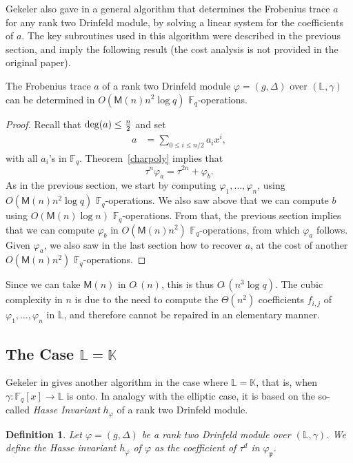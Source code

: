 \documentclass[sigconf]{acmart}
\newtheorem{definition}{Definition}
\newcommand{\M}{\mathsf{M}}
\newcommand{\K}{\mathbb{K}}
\newcommand{\F}{\mathbb{F}}
\renewcommand{\L}{\mathbb{L}}
\newcommand{\frakp}{\mathfrak{p}}
\newcommand{\softO}{O\tilde{~}}
\begin{document}
Gekeler also gave in \cite[Section~3]{frobdist} a general algorithm that
determines the Frobenius trace $a$ for any rank two Drinfeld module,
by solving a linear system for the coefficients of $a$. The key
subroutines used in this algorithm were described in the previous
section, and imply the following result (the cost analysis is not
provided in the original paper).
\begin{proposition}
  The Frobenius trace $a$ of a rank two Drinfeld module $\varphi = (g,
  \Delta)$ over $(\L,\gamma)$ can be determined in $O(\M(n)n^2 \log q)$
  $\F_q$-operations.
\end{proposition}
\begin{proof}
Recall that $\textnormal{deg}(a) \leq \frac{n}{2}$ and set
\begin{align*}
a & = \sum_{0 \le i \leq n/2} a_i x^i, 
\end{align*}
with all $a_i$'s in $\F_q$. Theorem~\ref{charpoly} implies
that 
\[ \tau^n \varphi_a = \tau^{2n} + \varphi_b.\]
As in the previous section, we start by computing
$\varphi_1,\dots,\varphi_n$, using $O(\M(n) n^2 \log q)$
$\F_q$-operations. We also saw above that we can compute $b$ using
$O(\M(n)\log n)$ $\F_q$-operations. From that, the previous section
implies that we can compute $\varphi_b$ in $O(\M(n) n^2)$
$\F_q$-operations, from which $\varphi_a$ follows. Given $\varphi_a$, we
also saw in the last section how to recover $a$, at the cost of
another $O(\M(n) n^2)$ $\F_q$-operations.
\end{proof}
Since we can take $\M(n)$ in $\softO(n)$, this is thus $\softO(n^3
\log q)$. The cubic complexity in $n$ is due to the need to compute
the $\Theta(n^2)$ coefficients $f_{i,j}$ of $\varphi_1,\dots,\varphi_n$ in
  $\L$, and therefore cannot be repaired in an elementary manner.


\subsection{The Case $\L = \K$}

Gekeler in \cite{frobdist} gives another algorithm in the case where
$\L = \K$, that is, when $\gamma: \F_q[x] \to \L$ is onto.  In analogy
with the elliptic case, it is based on the so-called {\em Hasse
  Invariant} $h_{\varphi}$ of a rank two Drinfeld module.

\begin{definition}
  Let $\varphi=(g, \Delta)$ be a rank two Drinfeld module over
  $(\L,\gamma)$. We define the {\em Hasse invariant} $h_{\varphi}$ of
  $\varphi$ as the coefficient of $\tau^{d}$ in $\varphi_{\frakp}$.
\end{definition}
\end{document}

